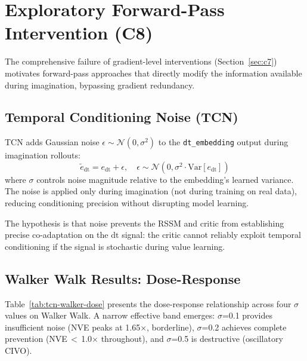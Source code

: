 \documentclass{article}
\newcommand{\dt}{\mathrm{dt}}
\begin{document}
\section{Exploratory Forward-Pass Intervention (C8)}

The comprehensive failure of gradient-level interventions (Section~\ref{sec:c7}) motivates forward-pass approaches that directly modify the information available during imagination, bypassing gradient redundancy.

\subsection{Temporal Conditioning Noise (TCN)}

TCN adds Gaussian noise $\epsilon \sim \mathcal{N}(0, \sigma^2)$ to the \texttt{dt\_embedding} output during imagination rollouts:
\begin{equation}
\tilde{e}_{\dt} = e_{\dt} + \epsilon, \quad \epsilon \sim \mathcal{N}(0, \sigma^2 \cdot \text{Var}[e_{\dt}])
\end{equation}
where $\sigma$ controls noise magnitude relative to the embedding's learned variance.
The noise is applied only during imagination (not during training on real data), reducing conditioning precision without disrupting model learning.

The hypothesis is that noise prevents the RSSM and critic from establishing precise co-adaptation on the $\dt$ signal: the critic cannot reliably exploit temporal conditioning if the signal is stochastic during value learning.

\subsection{Walker Walk Results: Dose-Response}

Table~\ref{tab:tcn-walker-dose} presents the dose-response relationship across four $\sigma$ values on Walker Walk.
A narrow effective band emerges: $\sigma$=0.1 provides insufficient noise (NVE peaks at 1.65$\times$, borderline), $\sigma$=0.2 achieves complete prevention (NVE\,$<$\,1.0$\times$ throughout), and $\sigma$=0.5 is destructive (oscillatory CIVO).
\end{document}
